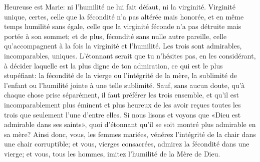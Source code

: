 Heureuse est Marie: ni l'humilité ne lui fait défaut, ni la virginité.
Virginité unique, certes,
	celle que la fécondité n'a pas altérée mais honorée,
	et en même temps humilité sans égale,
	celle que la virginité féconde n'a pas détruite mais portée à son sommet;
	et de plus, fécondité sans nulle autre pareille,
	celle qu'accompagnent à la fois la virginité et l'humilité.
Les trois sont admirables, incomparables, uniques.
L'étonnant serait que tu n'hésites pas, en les considérant,
	à décider laquelle est la plus digne de ton admiration,
	ce qui est le plus stupéfiant:
	la fécondité de la vierge ou l'intégrité de la mère,
	la sublimité de l'enfant ou l'humilité jointe à une telle sublimité.
Sauf, sans aucun doute, qu'à chaque chose prise séparément,
	il faut préférer les trois ensemble,
	et qu'il est incomparablement plus éminent et plus heureux
		de les avoir reçues toutes les trois que seulement l'une d'entre elles.
Si nous lisons et voyons que «Dieu est admirable dans ses saints»,
	quoi d'étonnant qu'il se soit montré plus admirable en sa mère?
Ainsi donc, vous, les femmes mariées,
	vénérez l'intégrité de la chair dans une chair corruptible;
	et vous, vierges consacrées, admirez la fécondité dans une vierge;
	et vous, tous les hommes, imitez l'humilité de la Mère de Dieu.

